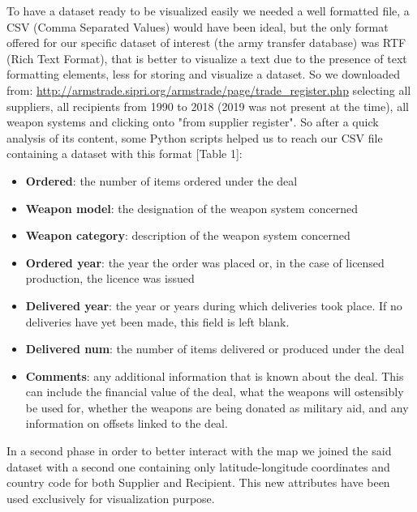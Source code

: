 \documentclass{article}
\begin{document}
\begin{multicols}{2}
To have a dataset ready to be visualized easily we needed a well formatted file, a CSV (Comma Separated Values) would have been ideal, but the only format offered for our specific dataset of interest (the army transfer database) was RTF (Rich Text Format), that is better to visualize a text due to the presence of text formatting elements, less for storing and visualize a dataset. So we downloaded from: \url{http://armstrade.sipri.org/armstrade/page/trade_register.php} selecting all suppliers, all recipients from 1990 to 2018 (2019 was not present at the time), all weapon systems and clicking onto "from supplier register". So after a quick analysis of its content, some Python scripts helped us to reach our CSV file containing a dataset with this format [Table 1]:
\begin{itemize}
\item \textbf{Ordered}: the number of items ordered under the deal
\item \textbf{Weapon model}: the designation of the weapon system concerned
\item \textbf{Weapon category}: description of the weapon system concerned
\item \textbf{Ordered year}: the year the order was placed or, in the case of licensed production, the licence was issued
\item \textbf{Delivered year}: the year or years during which deliveries took place. If no deliveries have yet been made, this field is left blank.
\item \textbf{Delivered num}: the number of items delivered or produced under the deal
\item \textbf{Comments}: any additional information that is known about the deal. This can include the financial value of the deal, what the weapons will ostensibly be used for, whether the weapons are being donated as military aid, and any information on offsets linked to the deal.
 
\end{itemize}



In a second phase in order to better interact with the map we joined the said dataset with a second one containing only latitude-longitude coordinates and country code for both Supplier and Recipient. This new attributes have been used exclusively for visualization purpose.


\end{multicols}
\end{document}
